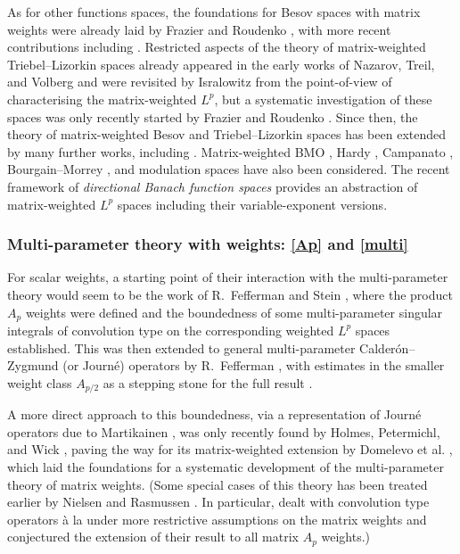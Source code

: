 \documentclass[11pt, reqno]{amsart}
\theoremstyle{definition}
\theoremstyle{remark}
\numberwithin{equation}{section}
\begin{document}
As for other functions spaces, the foundations for Besov spaces with matrix weights were already laid by Frazier and Roudenko \cite{FR04,FR08,Roud03,Roud04}, with more recent contributions including \cite{BYY}.
Restricted aspects of the theory of matrix-weighted Triebel--Lizorkin spaces already appeared in the early works of Nazarov, Treil, and Volberg \cite{NT96,Vol97} and were revisited by Isralowitz \cite{Is21} from the point-of-view of characterising the matrix-weighted $L^p$, but a systematic investigation of these spaces was only recently started by Frazier and Roudenko \cite{FR21}. Since then, the theory of matrix-weighted Besov and Triebel--Lizorkin spaces has been extended by many further works, including \cite{BX:nonreg,BX:Iran,BHYY:1a,BHYY:1b,BHYY:1c,BHYY:2b,BYYZ1,BYYZ2,lyy24,mx25,WYZ24,YYZ2}.
Matrix-weighted BMO \cite{IKP},
Hardy \cite{BCYY},
Campanato \cite{CYY},
Bourgain--Morrey \cite{bgx25,bx25},
and modulation spaces \cite{nie25a,wgx25}
have also been considered.
The recent framework of {\em directional Banach function spaces} \cite{Nie24} provides an abstraction of matrix-weighted $L^p$ spaces including their variable-exponent versions.

\subsubsection*{Multi-parameter theory with weights: \eqref{Ap} and \eqref{multi}}

For scalar weights, a starting point of their interaction with the multi-parameter theory would seem to be the work of R.~Fefferman and Stein \cite{FS82}, where the product $A_p$ weights were defined \cite[bottom of page 127]{FS82} and the boundedness of some multi-parameter singular integrals of convolution type on the corresponding weighted $L^p$ spaces established. This was then extended to general multi-parameter Calder\'on--Zygmund (or Journ\'e) operators by R.~Fefferman \cite{Fef87,Fef88}, with estimates in the smaller weight class $A_{p/2}$ \cite{Fef87} as a stepping stone for the full result \cite{Fef88}.

A more direct approach to this boundedness, via a representation of Journ\'e operators due to Martikainen \cite{Mar12}, was only recently found by Holmes, Petermichl, and Wick \cite{HPW18}, paving the way for its matrix-weighted extension by Domelevo et al. \cite{DKPS}, which laid the foundations for a systematic development of the multi-parameter theory of matrix weights.
(Some special cases of this theory has been treated earlier by Nielsen and Rasmussen \cite{nie13,nr18}. In particular, \cite{nr18} dealt with convolution type operators \`a la \cite{FS82} under more restrictive assumptions on the matrix weights and conjectured the extension of their result to all matrix $A_p$ weights.)
\end{document}
